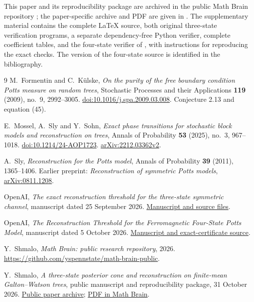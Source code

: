 \documentclass[11pt,reqno]{amsart}
\theoremstyle{definition}
\theoremstyle{remark}
\begin{document}
This paper and its reproducibility package are archived in the public Math Brain repository \cite{MathBrainPublic}; the paper-specific archive and PDF are given in \cite{ThisPaperArchive}. The supplementary material contains the complete \LaTeX{} source, both original three-state verification programs, a separate dependency-free Python verifier, complete coefficient tables, and the four-state verifier of \cite{OpenAI4}, with instructions for reproducing the exact checks. The version of the four-state source is identified in the bibliography.

\begin{thebibliography}{9}
M.~Formentin and C.~K\"ulske, \emph{On the purity of the free boundary condition Potts measure on random trees}, Stochastic Processes and their Applications \textbf{119} (2009), no.~9, 2992--3005. \href{https://doi.org/10.1016/j.spa.2009.03.008}{doi:10.1016/j.spa.2009.03.008}. Conjecture 2.13 and equation (45).

E.~Mossel, A.~Sly and Y.~Sohn, \emph{Exact phase transitions for stochastic block models and reconstruction on trees}, Annals of Probability \textbf{53} (2025), no.~3, 967--1018. \href{https://doi.org/10.1214/24-AOP1723}{doi:10.1214/24-AOP1723}. \href{https://arxiv.org/abs/2212.03362v2}{arXiv:2212.03362v2}.

A.~Sly, \emph{Reconstruction for the Potts model}, Annals of Probability \textbf{39} (2011), 1365--1406. Earlier preprint: \emph{Reconstruction of symmetric Potts models}, \href{https://arxiv.org/abs/0811.1208}{arXiv:0811.1208}.

OpenAI, \emph{The exact reconstruction threshold for the three-state symmetric channel}, manuscript dated 25 September 2026.
\href{https://github.com/openai/math/tree/1581d4cbdd69a0faf34b2089614fe2a814316a6a/preprints/The-exact-reconstruction-threshold-for-the-three-state-symmetric-channel-September-25-2026}{Manuscript and source files}.

OpenAI, \emph{The Reconstruction Threshold for the Ferromagnetic Four-State Potts Model}, manuscript dated 5 October 2026.
\href{https://github.com/openai/math/tree/1581d4cbdd69a0faf34b2089614fe2a814316a6a/preprints/The-Reconstruction-Threshold-for-the-Ferromagnetic-Four-State-Potts-Model-October-5-2026}{Manuscript and exact-certificate source}.

Y.~Shmalo, \emph{Math Brain: public research repository}, 2026.
\url{https://github.com/yspennstate/math-brain-public}.

Y.~Shmalo, \emph{A three-state posterior cone and reconstruction on finite-mean Galton--Watson trees}, public manuscript and reproducibility package, 31 October 2026.
\href{https://github.com/yspennstate/math-brain-public/tree/main/papers/three-targets-2026-10-31/T067}{Public paper archive};
\href{https://github.com/yspennstate/math-brain-public/blob/main/papers/three-targets-2026-10-31/T067/T067_Finite_Mean_Reconstruction.pdf}{PDF in Math Brain}.

\end{thebibliography}
\end{document}
